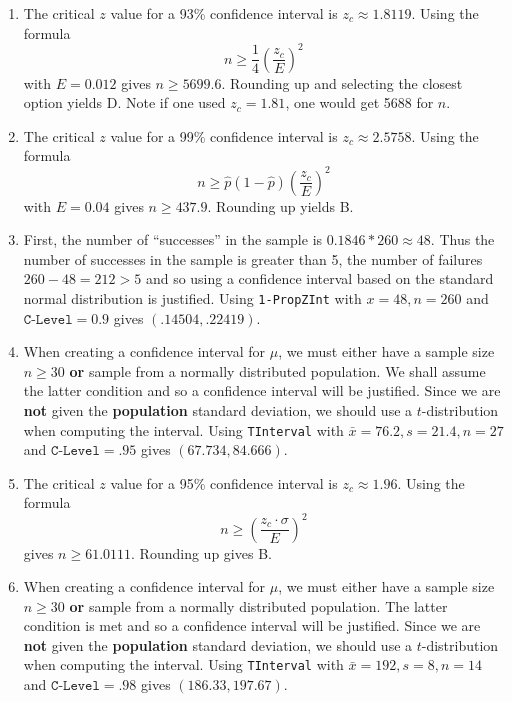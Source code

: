 \documentclass{article}
\newcommand{\answer}[1]{{\color{red}{\large \textbf{#1}}}}
\begin{document}
\pagestyle{myheadings}

\begin{center}
\textbf{}
\end{center}

\begin{enumerate}

\item \answer{D} The critical $z$ value for a 93\% confidence interval is $z_c \approx 1.8119$. Using the formula $$n \geq \frac{1}{4} \left(\frac{z_c}{E}\right)^2$$ with $E=0.012$ gives $n \geq 5699.6$. Rounding up and selecting the closest option yields D. Note if one used $z_c = 1.81$, one would get 5688 for $n$. 

\item \answer{B} The critical $z$ value for a 99\% confidence interval is $z_c \approx 2.5758$. Using the formula $$n \geq \hat{p}\left(1-\hat{p}\right) \left(\frac{z_c}{E}\right)^2$$ with $E=0.04$ gives $n \geq 437.9$. Rounding up yields B. 

\item \answer{C} First, the number of ``successes'' in the sample is $0.1846 * 260 \approx 48$. Thus the number of successes in the sample is greater than 5, the number of failures $260-48=212 > 5$ and so using a confidence interval based on the standard normal distribution is justified. Using \texttt{1-PropZInt} with $x=48, n=260$ and $\texttt{C-Level} = 0.9$ gives $(.14504, .22419)$.

\item \answer{C} When creating a confidence interval for $\mu$, we must either have a sample size $n\geq 30$ \textbf{or} sample from a normally distributed population. We shall assume the latter condition and so a confidence interval will be justified. Since we are \textbf{not} given the \textbf{population} standard deviation, we should use a $t$-distribution when computing the interval. Using \texttt{TInterval} with $\bar{x} = 76.2, s=21.4, n=27$ and $\texttt{C-Level} = .95$ gives $(67.734, 84.666)$.

\item \answer{B} The critical $z$ value for a 95\% confidence interval is $z_c \approx 1.96$. Using the formula $$n \geq \left(\frac{z_c\cdot \sigma}{E}\right)^2$$ gives $n\geq 61.0111$. Rounding up gives B.

\item \answer{A} When creating a confidence interval for $\mu$, we must either have a sample size $n\geq 30$ \textbf{or} sample from a normally distributed population. The latter condition is met and so a confidence interval will be justified. Since we are \textbf{not} given the \textbf{population} standard deviation, we should use a $t$-distribution when computing the interval. Using \texttt{TInterval} with $\bar{x} = 192, s=8, n=14$ and $\texttt{C-Level} = .98$ gives $(186.33, 197.67)$.


\end{enumerate}
\end{document}
